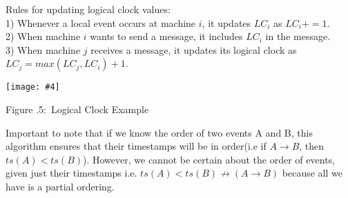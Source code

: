 \documentclass[twoside]{article}
\newcounter{lecnum}
\newcommand{\fig}[4]{
            \centerline{\texttt{[image: \#4]}}
            \begin{center}
            Figure \thelecnum.#1:~#3
            \end{center}
    }
\begin{document}
Rules for updating logical clock values:\\
1) Whenever a local event occurs at machine $i$, it updates $LC_i$ as $LC_i += 1$.\\
2) When machine $i$ wants to send a message, it includes $LC_i$ in the message.\\
3) When machine $j$ receives a message, it updates its logical clock as $LC_j = max(LC_j, LC_i) + 1$.

\fig{5}{0.6}{Logical Clock Example}{../Pictures/lc1.png}

Important to note that if we know the order of two events A and B, this algorithm ensures that their timestamps will be in order(i.e if $A\rightarrow B$, then $ts(A) < ts(B)$). However, we cannot be certain about the order of events, given just their timestamps i.e. $ts(A) < ts(B) \not \rightarrow (A\rightarrow B)$  because all we have is a partial ordering. 
\end{document}
